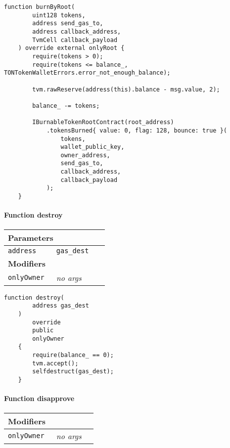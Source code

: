 \vspace{2cm}

\begin{lstlisting}[firstnumber=520]
    function burnByRoot(
        uint128 tokens,
        address send_gas_to,
        address callback_address,
        TvmCell callback_payload
    ) override external onlyRoot {
        require(tokens > 0);
        require(tokens <= balance_, TONTokenWalletErrors.error_not_enough_balance);

        tvm.rawReserve(address(this).balance - msg.value, 2);

        balance_ -= tokens;

        IBurnableTokenRootContract(root_address)
            .tokensBurned{ value: 0, flag: 128, bounce: true }(
                tokens,
                wallet_public_key,
                owner_address,
                send_gas_to,
                callback_address,
                callback_payload
            );
    }
\end{lstlisting}

\paragraph{Function destroy}


\ifsoltables
\noindent\begin{tabular}{|l|l|p{5cm}|}\hline
\multicolumn{3}{|l|}{\bf Parameters}\\\hline
\tt address & \tt gas\_{}dest &\\\hline
\multicolumn{3}{|l|}{\bf Modifiers}\\\hline
\tt onlyOwner & {\em no args} &\\\hline
\end{tabular}
\fi

\vspace{2cm}

\begin{lstlisting}[firstnumber=584]
    function destroy(
        address gas_dest
    )
        override
        public
        onlyOwner
    {
        require(balance_ == 0);
        tvm.accept();
        selfdestruct(gas_dest);
    }
\end{lstlisting}

\paragraph{Function disapprove}


\ifsoltables
\noindent\begin{tabular}{|l|l|p{5cm}|}\hline
\multicolumn{3}{|l|}{\bf Modifiers}\\\hline
\tt onlyOwner & {\em no args} &\\\hline
\end{tabular}
\fi

